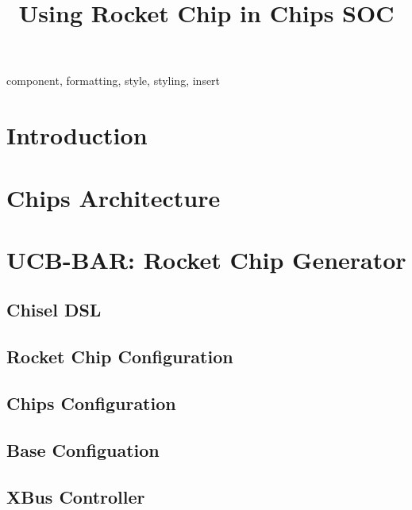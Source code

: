 \documentclass[12pt,conference]{IEEEtran}
\begin{document}
\title{Using Rocket Chip in Chips SOC
}

\author{
}

\maketitle

\begin{abstract}
\blindtext
\end{abstract}

\begin{IEEEkeywords}
component, formatting, style, styling, insert
\end{IEEEkeywords}
\section{Introduction}
\blindtext 

\blindtext

\section{Chips Architecture}



\section{UCB-BAR: Rocket Chip Generator}
\blindtext
\subsection{Chisel DSL}
\blindtext
\blindtext
\subsection{Rocket Chip Configuration}
\blindtext
\subsection{Chips Configuration}
\blindtext
\subsection{Base Configuation}
\blindtext
\subsection{XBus Controller}
\blindtext
\end{document}
